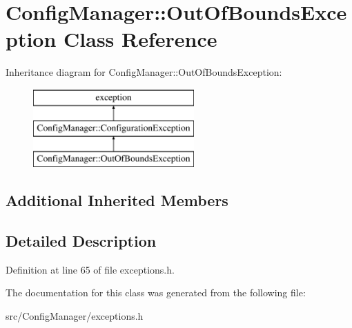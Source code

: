 \hypertarget{class_config_manager_1_1_out_of_bounds_exception}{}\section{Config\+Manager\+:\+:Out\+Of\+Bounds\+Exception Class Reference}
\label{class_config_manager_1_1_out_of_bounds_exception}
Inheritance diagram for Config\+Manager\+:\+:Out\+Of\+Bounds\+Exception\+:\begin{figure}[H]
\begin{center}
\leavevmode
\includegraphics[height=3.000000cm]{class_config_manager_1_1_out_of_bounds_exception}
\end{center}
\end{figure}
\subsection*{Additional Inherited Members}


\subsection{Detailed Description}


Definition at line 65 of file exceptions.\+h.



The documentation for this class was generated from the following file\+:\begin{DoxyCompactItemize}
\item 
src/\+Config\+Manager/exceptions.\+h\end{DoxyCompactItemize}
